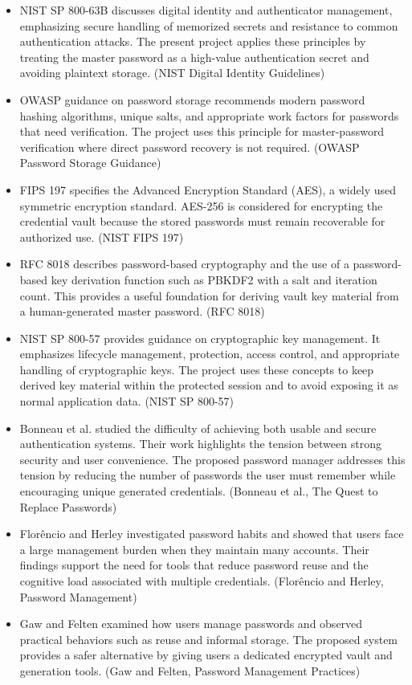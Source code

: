 \documentclass[12pt,a4paper,oneside]{report}
\begin{document}
\begin{itemize}
\item NIST SP 800-63B discusses digital identity and authenticator management, emphasizing secure handling of memorized secrets and resistance to common authentication attacks. The present project applies these principles by treating the master password as a high-value authentication secret and avoiding plaintext storage. (NIST Digital Identity Guidelines)
\item OWASP guidance on password storage recommends modern password hashing algorithms, unique salts, and appropriate work factors for passwords that need verification. The project uses this principle for master-password verification where direct password recovery is not required. (OWASP Password Storage Guidance)
\item FIPS 197 specifies the Advanced Encryption Standard (AES), a widely used symmetric encryption standard. AES-256 is considered for encrypting the credential vault because the stored passwords must remain recoverable for authorized use. (NIST FIPS 197)
\item RFC 8018 describes password-based cryptography and the use of a password-based key derivation function such as PBKDF2 with a salt and iteration count. This provides a useful foundation for deriving vault key material from a human-generated master password. (RFC 8018)
\item NIST SP 800-57 provides guidance on cryptographic key management. It emphasizes lifecycle management, protection, access control, and appropriate handling of cryptographic keys. The project uses these concepts to keep derived key material within the protected session and to avoid exposing it as normal application data. (NIST SP 800-57)
\item Bonneau et al. studied the difficulty of achieving both usable and secure authentication systems. Their work highlights the tension between strong security and user convenience. The proposed password manager addresses this tension by reducing the number of passwords the user must remember while encouraging unique generated credentials. (Bonneau et al., The Quest to Replace Passwords)
\item Florêncio and Herley investigated password habits and showed that users face a large management burden when they maintain many accounts. Their findings support the need for tools that reduce password reuse and the cognitive load associated with multiple credentials. (Florêncio and Herley, Password Management)
\item Gaw and Felten examined how users manage passwords and observed practical behaviors such as reuse and informal storage. The proposed system provides a safer alternative by giving users a dedicated encrypted vault and generation tools. (Gaw and Felten, Password Management Practices)

\end{itemize}
\end{document}
